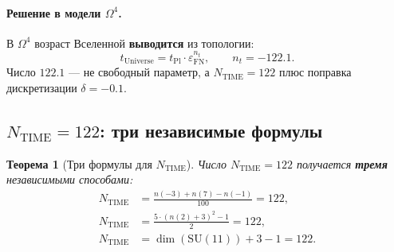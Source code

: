 \documentclass[11pt,a4paper]{article}
\newcommand{\SU}{\mathrm{SU}}
\newcommand{\Om}{\Omega^4}
\newcommand{\epsFN}{\varepsilon_{\text{FN}}}
\newtheorem{theorem}{Теорема}[section]
\theoremstyle{definition}
\begin{document}
\paragraph{Решение в модели $\Om$.}
В $\Om$ возраст Вселенной \textbf{выводится} из топологии:
\begin{equation}
    \boxed{
    t_{\text{Universe}} = t_{\text{Pl}} \cdot \epsFN^{n_t},
    \qquad n_t = -122.1.
    }
    \label{eq:time-formula}
\end{equation}
Число $122.1$ — не свободный параметр, а $N_{\text{TIME}} = 122$ 
плюс поправка дискретизации $\delta = -0.1$.

\subsection{$N_{\text{TIME}} = 122$: три независимые формулы}
\label{subsec:n-time-122}

\begin{theorem}[Три формулы для $N_{\text{TIME}}$]
\label{thm:ntime-three}
Число $N_{\text{TIME}} = 122$ получается \textbf{тремя} 
независимыми способами:
\begin{align}
    N_{\text{TIME}} &= \frac{n(-3) + n(7) - n(-1)}{100} = 122,
    \label{eq:ntime-v1} \\[0.3em]
    N_{\text{TIME}} &= \frac{5 \cdot (n(2) + 3)^2 - 1}{2} = 122,
    \label{eq:ntime-v2} \\[0.3em]
    N_{\text{TIME}} &= \dim(\SU(11)) + 3 - 1 = 122.
    \label{eq:ntime-v3}
\end{align}
\end{theorem}
\end{document}
